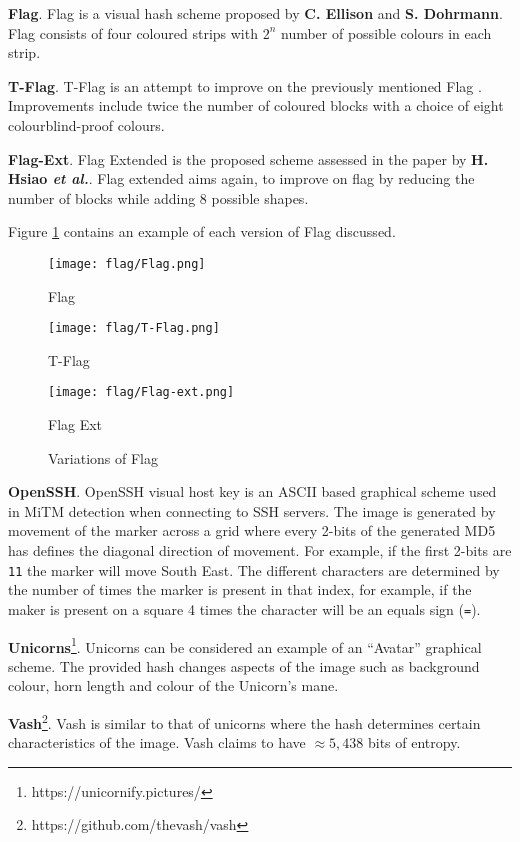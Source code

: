\textbf{Flag}. Flag is a visual hash scheme proposed by \textbf{C. Ellison} and \textbf{S. Dohrmann}\cite{ellison2003public}. Flag consists of four coloured strips with $2^n$ number of possible colours in each strip. 

\textbf{T-Flag}. T-Flag is an attempt to improve on the previously mentioned Flag \cite{lin2010spate}. Improvements include twice the number of coloured blocks with a choice of eight colourblind-proof colours.

\textbf{Flag-Ext}. Flag Extended is the proposed scheme assessed in the paper by \textbf{H. Hsiao \textit{et al.}}\cite{hsiao2009study}. Flag extended aims again, to improve on flag by reducing the number of blocks while adding 8 possible shapes.

Figure \ref{fig:flag} contains an example of each version of Flag discussed.

\begin{figure}[h!]
    \centering
        \texttt{[image: flag/Flag.png]}
        \caption{Flag}
    \endminipage
        \texttt{[image: flag/T-Flag.png]}
        \caption{T-Flag}
    \endminipage
        \texttt{[image: flag/Flag-ext.png]}
        \caption{Flag Ext}
    \endminipage
    \caption{Variations of Flag}
    \label{fig:flag}
\end{figure}

\textbf{OpenSSH}. OpenSSH visual host key is an ASCII based graphical scheme used in MiTM detection when connecting to SSH servers. The image is generated by movement of the marker across a grid where every 2-bits of the generated MD5 has defines the diagonal direction of movement. For example, if the first 2-bits are \verb|11| the marker will move South East. The different characters are determined by the number of times the marker is present in that index, for example, if the maker is present on a square 4 times the character will be an equals sign (\verb|=|).

\textbf{Unicorns}\footnote{https://unicornify.pictures/}. Unicorns can be considered an example of an ``Avatar'' graphical scheme. The provided hash changes aspects of the image such as background colour, horn length and colour of the Unicorn's mane.

\textbf{Vash}\footnote{https://github.com/thevash/vash}. Vash is similar to that of unicorns where the hash determines certain characteristics of the image. Vash claims to have $\approx 5,438$ bits of entropy.

